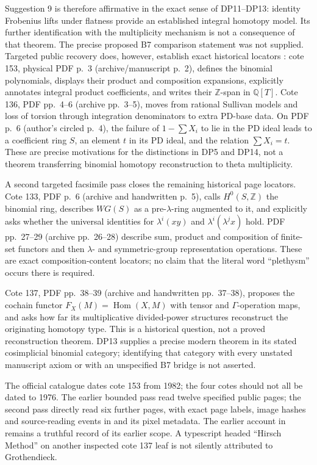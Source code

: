 \documentclass[11pt,a4paper]{article}
\theoremstyle{definition}\newtheorem{remark}[theorem]{Remark}
\newcommand{\Z}{\mathbb Z}\newcommand{\Q}{\mathbb Q}\newcommand{\F}{\mathbb F}
\begin{document}
Suggestion 9 is therefore affirmative in the exact sense of DP11--DP13: identity Frobenius lifts under flatness provide an established integral homotopy model. Its further identification with the multiplicity mechanism is not a consequence of that theorem. The precise proposed B7 comparison statement was not supplied. Targeted public recovery does, however, establish exact historical locators \cite{PublicArchive}: cote 153, physical PDF p.~3 (archive/manuscript p.~2), defines the binomial polynomials, displays their product and composition expansions, explicitly annotates integral product coefficients, and writes their $\Z$-span in $\Q[T]$. Cote 136, PDF pp.~4--6 (archive pp.~3--5), moves from rational Sullivan models and loss of torsion through integration denominators to extra PD-base data. On PDF p.~6 (author's circled p.~4), the failure of $1-\sum X_i$ to lie in the PD ideal leads to a coefficient ring $S$, an element $t$ in its PD ideal, and the relation $\sum X_i=t$. These are precise motivations for the distinctions in DP5 and DP14, not a theorem transferring binomial homotopy reconstruction to theta multiplicity.

A second targeted facsimile pass closes the remaining historical page locators. Cote 133, PDF p.~6 (archive and handwritten p.~5), calls $H^0(S,\Z)$ the binomial ring, describes $WG(S)$ as a pre-$\lambda$-ring augmented to it, and explicitly asks whether the universal identities for $\lambda^i(xy)$ and $\lambda^i(\lambda^j x)$ hold. PDF pp.~27--29 (archive pp.~26--28) describe sum, product and composition of finite-set functors and then $\lambda$- and symmetric-group representation operations. These are exact composition-content locators; no claim that the literal word ``plethysm'' occurs there is required.

Cote 137, PDF pp.~38--39 (archive and handwritten pp.~37--38), proposes the cochain functor $F_X(M)=\operatorname{Hom}(X,M)$ with tensor and $\Gamma$-operation maps, and asks how far its multiplicative divided-power structures reconstruct the originating homotopy type. This is a historical question, not a proved reconstruction theorem. DP13 supplies a precise modern theorem in its stated cosimplicial binomial category; identifying that category with every unstated manuscript axiom or with an unspecified B7 bridge is not asserted.

The official catalogue dates cote 153 from 1982; the four cotes should not all be dated to 1976. The earlier bounded pass read twelve specified public pages; the second pass directly read six further pages, with exact page labels, image hashes and source-reading events in  and its pixel metadata. The earlier account in  remains a truthful record of its earlier scope. A typescript headed ``Hirsch Method'' on another inspected cote 137 leaf is not silently attributed to Grothendieck.
\end{document}

